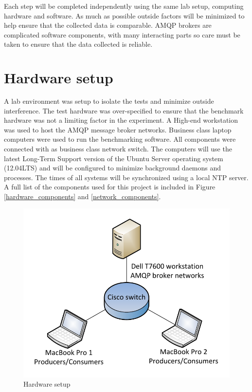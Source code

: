\documentclass{thesis}
\begin{document}
Each step will be completed independently using the same lab setup, computing hardware and software.  As much as possible outside factors will be minimized to help ensure that the collected data is comparable.  AMQP brokers are complicated software components, with many interacting parts so care must be taken to ensure that the data collected is reliable.  

\section{Hardware setup}
A lab environment was setup to isolate the tests and minimize outside interference.  The test hardware was over-specified to ensure that the benchmark hardware was not a limiting factor in the experiment.  A High-end workstation was used to host the AMQP message broker networks.  Business class laptop computers were used to run the benchmarking software.  All components were connected with as business class network switch.  The computers will use the latest Long-Term Support version of the Ubuntu Server operating system (12.04LTS) and will be configured to minimize background daemons and processes.  The times of all systems will be synchronized using a local NTP server.  A full list of the components used for this project is included in Figure \ref{hardware_components} and \ref{network_components}.

\begin{figure}[h]
\centering
\includegraphics{test_setup_2}  
\caption{Hardware setup}
\end{figure}
\end{document}
